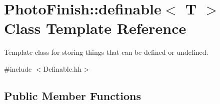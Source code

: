 \hypertarget{class_photo_finish_1_1definable}{}\section{Photo\+Finish\+:\+:definable$<$ T $>$ Class Template Reference}
\label{class_photo_finish_1_1definable}


Template class for storing things that can be defined or undefined.  




{\ttfamily \#include $<$Definable.\+hh$>$}

\subsection*{Public Member Functions}

